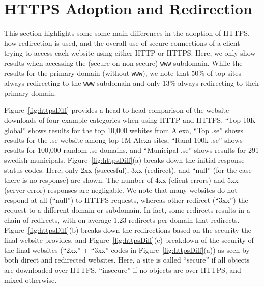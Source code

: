 \documentclass{sig-alternate-10pt}
\begin{document}
\section{HTTPS Adoption and Redirection}\label{sec:https}

This section highlights some some main differences in the adoption of HTTPS, 
how redirection is used, and the overall use of secure connections of 
a client trying to access each website using either HTTP or HTTPS.
Here, we only show results when accessing the (secure on non-secure) \texttt{www} subdomain.
While the results for the primary domain (without \texttt{www}),
we note that 50\% of top sites always redirecting to the \texttt{www} subdomain
and only 13\% always redirecting to their primary domain.

Figure~\ref{fig:httpsDiff} provides a head-to-head comparison of the 
website downloads of four example categories when using HTTP and HTTPS.
``Top-10K global'' shows results for the top 10,000 webites from Alexa,
``Top .se'' shows results for the .se website among top-1M Alexa sites,
``Rand 100k .se'' shows results for 100,000 random .se domains,
and ``Municipal .se'' shows results for 291 swedish municipals.
Figure~\ref{fig:httpsDiff}(a) breaks down the initial response status codes.
Here, only 2xx (succesful), 3xx (redirect), and ``null'' (for the case there is no response)
are shown.  The number of 4xx (client errors) and 5xx (server error) responses are negligable. 
We note that many websites do not respond at all (``null'') to HTTPS requests,
whereas other redirect (``3xx'') the request to a different domain or subdomain.
In fact, some redirects results in a chain of redirects,
with on average 1.23 redirects per domain that redirects.
Figure~\ref{fig:httpsDiff}(b) breaks down the redirections based on the security
the final website provides, 
and Figure~\ref{fig:httpsDiff}(c) breakdown of the security of the final websites 
(``2xx'' + ``3xx'' codes in Figure~\ref{fig:httpsDiff}(a))
as seen by both direct and redirected websites.
Here, 
a site is called ``secure'' if all objects are downloaded over HTTPS,
``insecure'' if no objects are over HTTPS, and mixed otherwise.
\end{document}
